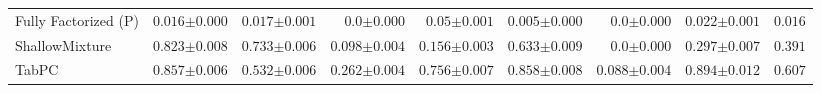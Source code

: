 \begin{tabular}{lrrrrrrr|r}
    Fully Factorized (P) & $0.016${\tiny${\pm 0.000}$} & $0.017${\tiny${\pm 0.001}$} & $0.0${\tiny${\pm 0.000}$} & $0.05${\tiny${\pm 0.001}$} & $0.005${\tiny${\pm 0.000}$} & $0.0${\tiny${\pm 0.000}$} & $0.022${\tiny${\pm 0.001}$} & $0.016$ \\
    ShallowMixture & $0.823${\tiny${\pm 0.008}$} & $0.733${\tiny${\pm 0.006}$} & $0.098${\tiny${\pm 0.004}$} & $0.156${\tiny${\pm 0.003}$} & $0.633${\tiny${\pm 0.009}$} & $0.0${\tiny${\pm 0.000}$} & $0.297${\tiny${\pm 0.007}$} & $0.391$ \\
    TabPC & $0.857${\tiny${\pm 0.006}$} & $0.532${\tiny${\pm 0.006}$} & $0.262${\tiny${\pm 0.004}$} & $0.756${\tiny${\pm 0.007}$} & $0.858${\tiny${\pm 0.008}$} & $0.088${\tiny${\pm 0.004}$} & $0.894${\tiny${\pm 0.012}$} & $0.607$ \\
    \bottomrule[1.0pt]
\end{tabular}